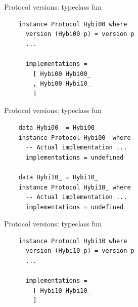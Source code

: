 \documentclass[20pt]{beamer}
\begin{document}
\begin{frame}[fragile]{Protocol versions: typeclass fun}
    \begin{lstlisting}
    instance Protocol Hybi00 where
      version (Hybi00 p) = version p
      ...

      implementations =
        [ Hybi00 Hybi00_
        , Hybi00 Hybi10_
        ]
    \end{lstlisting}
\end{frame}

\begin{frame}[fragile]{Protocol versions: typeclass fun}
    \begin{lstlisting}
    data Hybi00_ = Hybi00_
    instance Protocol Hybi00_ where
      -- Actual implementation ...
      implementations = undefined

    data Hybi10_ = Hybi10_
    instance Protocol Hybi10_ where
      -- Actual implementation ...
      implementations = undefined
    \end{lstlisting}
\end{frame}

\begin{frame}[fragile]{Protocol versions: typeclass fun}
    \begin{lstlisting}
    instance Protocol Hybi10 where
      version (Hybi10 p) = version p
      ...

      implementations =
        [ Hybi10 Hybi10_
        ]
    \end{lstlisting}
\end{frame}




\end{document}
